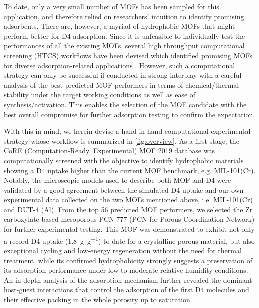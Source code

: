 To date, only a very small number of MOFs has been sampled for this application,
and therefore relied on researchers' intuition to identify promising adsorbents.
There are, however, a myriad of hydrophobic MOFs that might perform better for
D4 adsorption. Since it is unfeasible to individually test the performances of
all the existing MOFs, several high throughput computational screening (HTCS)
workflows have been devised which identified promising MOFs for diverse
adsorption-related applications \citep{simonWhatAreBest2015,
parkEstablishingUpperBounds2017, moghadamComputeraidedDiscoveryMetal2018,
boydDatadrivenDesignMetal2019, shiMachineLearningSilico2020,
yaoInverseDesignNanoporous2021}. However, such a computational strategy can only
be successful if conducted in strong interplay with a careful analysis of the
best-predicted MOF performers in terms of chemical/thermal stability under the
target working conditions as well as ease of synthesis/activation. This enables
the selection of the MOF candidate with the best overall compromise for further
adsorption testing to confirm the expectation.

With this in mind, we herein devise a hand-in-hand computational-experimental
strategy whose workflow is summarized in \cref{fig:overview}. As a first stage,
the CoRE (Computation-Ready, Experimental) MOF 2019 database
\citep{chungAdvancesUpdatesAnalytics2019} was computationally screened with the
objective to identify hydrophobic materials showing a D4 uptake higher than the
current MOF benchmark, e.g. MIL-101(Cr). Notably, the microscopic models used to
describe both MOF and D4 were validated by a good agreement between the
simulated D4 uptake and our own experimental data collected on the two MOFs
mentioned above, i.e. MIL-101(Cr) and DUT-4 (Al). From the top 56 predicted MOF
performers, we selected the Zr carboxylate-based mesoporous PCN-777 (PCN for
Porous Coordination Network) for further experimental testing. This MOF was
demonstrated to exhibit not only a record D4 uptake (\SI{1.8}{\gram\per\gram})
to date for a crystalline porous material, but also exceptional cycling and
low-energy regeneration without the need for thermal treatment, while its
confirmed hydrophobicity strongly suggests a preservation of its adsorption
performance under low to moderate relative humidity conditions. An in-depth
analysis of the adsorption mechanism further revealed the dominant host-guest
interactions that control the adsorption of the first D4 molecules and their
effective packing in the whole porosity up to saturation.

